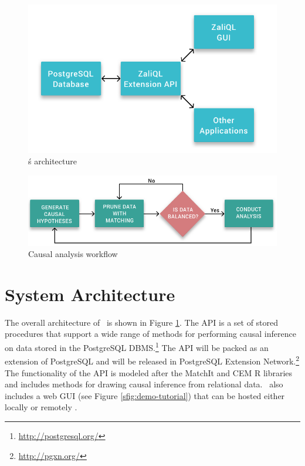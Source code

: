 
\begin{figure}
 \includegraphics[scale=0.25]{Figures/System-Overview.png}
  \vspace{-3mm} \caption{\GSQLB\'s architecture}
 
  \label{fig:arch}
  \vspace{-3mm}
\end{figure}


\begin{figure}
  \includegraphics[scale=0.25]{Figures/Matching-Flowchart.png}
  \vspace{-3mm}\caption{Causal analysis workflow}

\label{fig:flowchart}
\vspace{-0.3cm}
\end{figure}



\section{System Architecture}

The overall architecture of \GSQL\ is shown in Figure \ref{fig:arch}.
The API is a set of stored procedures that support a wide
range of methods for performing causal inference on data stored in the
PostgreSQL DBMS.\footnote{\url{http://postgresql.org/}}
The API will be packed  as an extension of  PostgreSQL and will be released in
PostgreSQL Extension Network.\footnote{\url{http://pgxn.org/}}
The functionality of the API is modeled after the MatchIt and CEM R
libraries \cite{ho2005,iacus2009cem} and includes methods for drawing causal inference from relational data. \GSQL\ also includes a web GUI
(see Figure \ref{sfig:demo-tutorial}) that can be hosted either locally or
remotely . %

